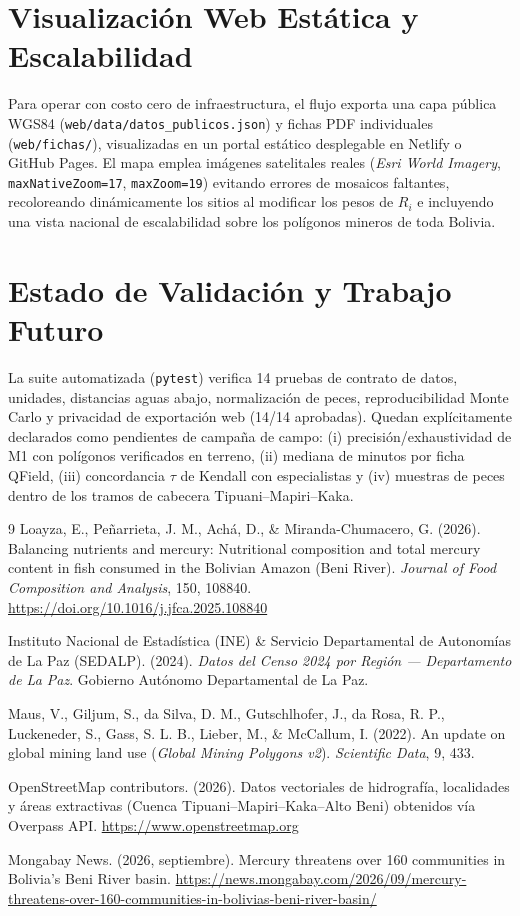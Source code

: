 \documentclass[11pt,a4paper]{article}
\begin{document}
\section{Visualización Web Estática y Escalabilidad}
Para operar con costo cero de infraestructura, el flujo exporta una capa pública WGS84 (\texttt{web/data/datos\_publicos.json}) y fichas PDF individuales (\texttt{web/fichas/}), visualizadas en un portal estático desplegable en Netlify o GitHub Pages. El mapa emplea imágenes satelitales reales (\textit{Esri World Imagery}, \texttt{maxNativeZoom=17}, \texttt{maxZoom=19}) evitando errores de mosaicos faltantes, recoloreando dinámicamente los sitios al modificar los pesos de $R_i$ e incluyendo una vista nacional de escalabilidad sobre los polígonos mineros de toda Bolivia.

\section{Estado de Validación y Trabajo Futuro}
La suite automatizada (\texttt{pytest}) verifica 14 pruebas de contrato de datos, unidades, distancias aguas abajo, normalización de peces, reproducibilidad Monte Carlo y privacidad de exportación web (14/14 aprobadas). Quedan explícitamente declarados como pendientes de campaña de campo: (i) precisión/exhaustividad de M1 con polígonos verificados en terreno, (ii) mediana de minutos por ficha QField, (iii) concordancia $\tau$ de Kendall con especialistas y (iv) muestras de peces dentro de los tramos de cabecera Tipuani--Mapiri--Kaka.

\begin{thebibliography}{9}
Loayza, E., Peñarrieta, J. M., Achá, D., \& Miranda-Chumacero, G. (2026). Balancing nutrients and mercury: Nutritional composition and total mercury content in fish consumed in the Bolivian Amazon (Beni River). \textit{Journal of Food Composition and Analysis}, 150, 108840. \url{https://doi.org/10.1016/j.jfca.2025.108840}

Instituto Nacional de Estadística (INE) \& Servicio Departamental de Autonomías de La Paz (SEDALP). (2024). \textit{Datos del Censo 2024 por Región — Departamento de La Paz}. Gobierno Autónomo Departamental de La Paz.

Maus, V., Giljum, S., da Silva, D. M., Gutschlhofer, J., da Rosa, R. P., Luckeneder, S., Gass, S. L. B., Lieber, M., \& McCallum, I. (2022). An update on global mining land use (\textit{Global Mining Polygons v2}). \textit{Scientific Data}, 9, 433.

OpenStreetMap contributors. (2026). Datos vectoriales de hidrografía, localidades y áreas extractivas (Cuenca Tipuani--Mapiri--Kaka--Alto Beni) obtenidos vía Overpass API. \url{https://www.openstreetmap.org}

Mongabay News. (2026, septiembre). Mercury threatens over 160 communities in Bolivia's Beni River basin. \url{https://news.mongabay.com/2026/09/mercury-threatens-over-160-communities-in-bolivias-beni-river-basin/}
\end{thebibliography}
\end{document}

